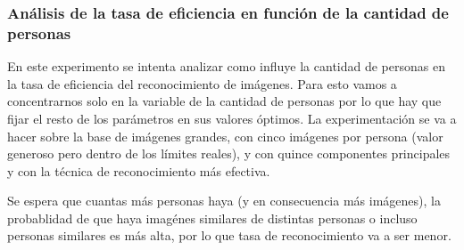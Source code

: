 \subsubsection{Análisis de la tasa de eficiencia en función de la cantidad de personas}
En este experimento se intenta analizar como influye la cantidad de personas en la tasa de eficiencia del reconocimiento de imágenes. Para esto vamos a concentrarnos solo en la variable de la cantidad de personas por lo que hay que fijar el resto de los parámetros en sus valores óptimos. La experimentación se va a hacer sobre la base de imágenes grandes, con cinco imágenes por persona (valor generoso pero dentro de los límites reales), y con quince componentes principales y con la técnica de reconocimiento más efectiva.

Se espera que cuantas más personas haya (y en consecuencia más imágenes), la probablidad de que haya imagénes similares de distintas personas o incluso personas similares es más alta, por lo que tasa de reconocimiento va a ser menor.
